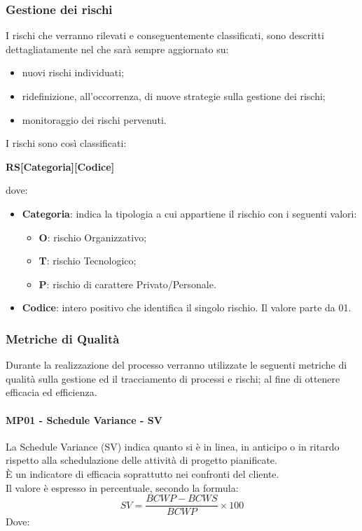		 \subsubsection{Gestione dei rischi}
		 I rischi che verranno rilevati e conseguentemente classificati, sono descritti dettagliatamente nel  che sarà sempre aggiornato su:
		 \begin{itemize}
		 	\item nuovi rischi individuati;
		 	\item ridefinizione, all'occorrenza, di nuove strategie sulla gestione dei rischi;
		 	\item monitoraggio dei rischi pervenuti.
		 \end{itemize}
	 	\noindent
	 	I rischi sono così classificati: 
	 	\begin{center}
	 			{\bfseries RS[Categoria][Codice]}
	 	\end{center}
	 	dove:
	 	\begin{itemize}
	 		\item \textbf{Categoria}: indica la tipologia a cui appartiene il rischio con i seguenti valori:	 
	 	\begin{itemize}
	 		\item {\bfseries O}: rischio Organizzativo;
	 		\item {\bfseries T}: rischio Tecnologico;
	 		\item {\bfseries P}: rischio di carattere Privato/Personale. \\
	 	\end{itemize}
 			\item \textbf{Codice}: intero positivo che identifica il singolo rischio. Il valore parte da 01.
	 	\end{itemize}
 	\newpage	
	 \subsubsection{Metriche di Qualità}
	 Durante la realizzazione del processo verranno utilizzate le seguenti metriche di qualità sulla gestione ed il tracciamento di processi e rischi; al fine di ottenere efficacia ed efficienza.  
	 \paragraph{MP01 - Schedule Variance - SV}
	 La Schedule Variance (SV) indica quanto si è in linea, in anticipo o in ritardo rispetto alla schedulazione delle attività di progetto pianificate. \\
	 È un indicatore di efficacia soprattutto nei confronti del cliente.\\
	 Il valore è espresso in percentuale, secondo la formula:
	\begin{displaymath}
		SV = \frac{BCWP-BCWS}{BCWP}\times100
	\end{displaymath}
	Dove:

